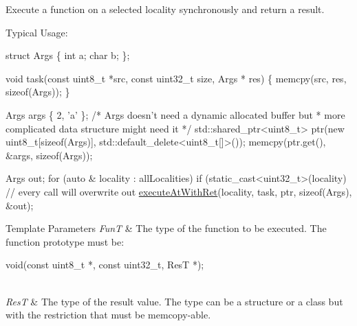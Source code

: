 Execute a function on a selected locality synchronously and return a result. 

Typical Usage\-: 
\begin{DoxyCode}
\textcolor{keyword}{struct }Args \{
  \textcolor{keywordtype}{int} a;
  \textcolor{keywordtype}{char} b;
\};

\textcolor{keywordtype}{void} task(\textcolor{keyword}{const} uint8\_t *src, \textcolor{keyword}{const} uint32\_t size,
          Args * res) \{
  memcpy(src, res, \textcolor{keyword}{sizeof}(Args));
\}

Args args \{ 2, \textcolor{charliteral}{'a'} \};
\textcolor{comment}{/* Args doesn't need a dynamic allocated buffer but}
\textcolor{comment}{ * more complicated data structure might need it */}
std::shared\_ptr<uint8\_t> ptr(\textcolor{keyword}{new} uint8\_t[\textcolor{keyword}{sizeof}(Args)],
                             std::default\_delete<uint8\_t[]>());
memcpy(ptr.get(), &args, \textcolor{keyword}{sizeof}(Args));

Args out;
\textcolor{keywordflow}{for} (\textcolor{keyword}{auto} & locality : allLocalities)
  \textcolor{keywordflow}{if} (static\_cast<uint32\_t>(locality) %
    \textcolor{comment}{// every call will overwrite out}
    \hyperlink{namespaceshad_1_1rt_a750ac93a8d339b97e3a11e182b50ffbc}{executeAtWithRet}(locality, task, ptr, \textcolor{keyword}{sizeof}(Args), &out);
\end{DoxyCode}



\begin{DoxyTemplParams}{Template Parameters}
{\em Fun\-T} & The type of the function to be executed. The function prototype must be\-: 
\begin{DoxyCode}
void(\textcolor{keyword}{const} uint8\_t *, \textcolor{keyword}{const} uint32\_t, ResT *);
\end{DoxyCode}
\\
\hline
{\em Res\-T} & The type of the result value. The type can be a structure or a class but with the restriction that must be memcopy-\/able.\\
\hline
\end{DoxyTemplParams}

